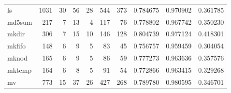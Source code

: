 \begin{tabular}{lrrrrrrrrr}
ls        &                   1031 &                                 30 &                                56 &                               28 &                               544 &                             373 &                                0.784675 &                               0.970902 &                             0.361785 \\
md5sum    &                    217 &                                  7 &                                13 &                                4 &                               117 &                              76 &                                0.778802 &                               0.967742 &                             0.350230 \\
mkdir     &                    306 &                                  7 &                                15 &                               10 &                               146 &                             128 &                                0.804739 &                               0.977124 &                             0.418301 \\
mkfifo    &                    148 &                                  6 &                                 9 &                                5 &                                83 &                              45 &                                0.756757 &                               0.959459 &                             0.304054 \\
mknod     &                    165 &                                  6 &                                 9 &                                5 &                                86 &                              59 &                                0.777273 &                               0.963636 &                             0.357576 \\
mktemp    &                    164 &                                  6 &                                 8 &                                5 &                                91 &                              54 &                                0.772866 &                               0.963415 &                             0.329268 \\
mv        &                    773 &                                 15 &                                37 &                               26 &                               427 &                             268 &                                0.789780 &                               0.980595 &                             0.346701 \\

\end{tabular}
